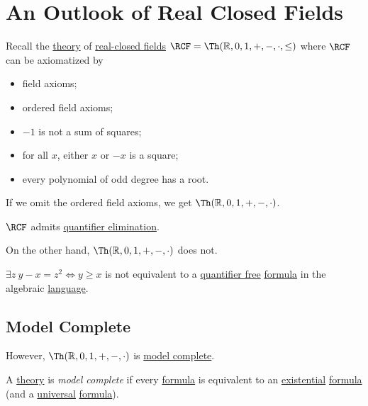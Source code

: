 \section{An Outlook of Real Closed Fields}
Recall the \hyperref[def:theory]{theory} of \hyperref[prev:real-closed-field]{real-closed fields} \(\RCF = \Th(\mathbb{R} , 0, 1, +, -, \cdot, \leq )\) where \(\RCF\) can be axiomatized by
\begin{itemize}
	\item field axioms;
	\item ordered field axioms;
	\item \(-1\) is not a sum of squares;
	\item for all \(x\), either \(x\) or \(-x\) is a square;
	\item every polynomial of odd degree has a root.
\end{itemize}

\begin{remark}
	If we omit the ordered field axioms, we get \(\Th(\mathbb{R} , 0, 1, +, -, \cdot) \).
\end{remark}

\begin{theorem}\label{thm:RCF-QE}
	\(\RCF\) admits \hyperref[def:quantifier-elimination]{quantifier elimination}.
\end{theorem}

On the other hand, \(\Th(\mathbb{R} , 0, 1, +, -, \cdot) \) does not.

\begin{eg}
	\(\exists z\ y - x = z^2 \iff y \geq x\) is not equivalent to a \hyperref[not:quantifier-free]{quantifier free} \hyperref[def:formula]{formula} in the algebraic \hyperref[def:language]{language}.
\end{eg}

\subsection{Model Complete}
However, \(\Th(\mathbb{R} , 0, 1, +, -, \cdot) \) is \hyperref[def:model-complete]{model complete}.

\begin{definition}\label{def:model-complete}
	A \hyperref[def:theory]{theory} is \emph{model complete} if every \hyperref[def:formula]{formula} is equivalent to an \hyperref[not:existential]{existential} \hyperref[def:formula]{formula} (and a \hyperref[not:universal]{universal} \hyperref[def:formula]{formula}).
\end{definition}

